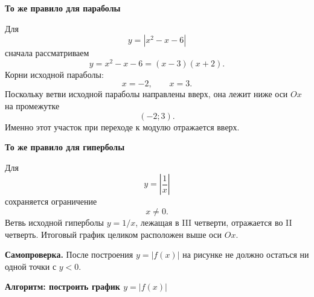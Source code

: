 \documentclass[a4paper,12pt]{article}
\newcommand{\subtopic}[1]{%
  \vspace{0.35em}
  {\large\bfseries\color{darkaccent}#1}\par
  \vspace{0.1em}
}
\newcommand{\key}[1]{\textbf{\color{darkaccent}#1}}
\begin{document}
\subtopic{То же правило для параболы}

Для
\[
  y=|x^2-x-6|
\]
сначала рассматриваем
\[
  y=x^2-x-6=(x-3)(x+2).
\]
Корни исходной параболы:
\[
  x=-2,
  \qquad
  x=3.
\]
Поскольку ветви исходной параболы направлены вверх, она лежит ниже оси $Ox$
на промежутке
\[
  (-2;3).
\]
Именно этот участок при переходе к модулю отражается вверх.

\subtopic{То же правило для гиперболы}

Для
\[
  y=\left|\frac1x\right|
\]
сохраняется ограничение
\[
  x\ne0.
\]
Ветвь исходной гиперболы $y=1/x$, лежащая в III четверти,
отражается во II четверть. Итоговый график целиком расположен выше оси $Ox$.

\key{Самопроверка.}
После построения $y=|f(x)|$ на рисунке не должно остаться ни одной точки с $y<0$.


\clearpage
\thispagestyle{fancy}

\begin{center}
{\Large\bfseries\color{darkaccent}
Алгоритм: построить график $y=|f(x)|$}
\end{center}

\vspace{8mm}
\end{document}
